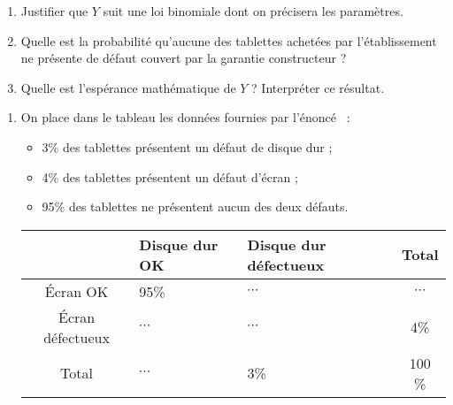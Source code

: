 \par
\begin{enumerate}
     \par
     \item %
     Justifier que $Y$ suit une loi binomiale dont on précisera les paramètres.
     \par
     \item %
     Quelle est la probabilité qu'aucune des tablettes achetées par l'établissement ne présente de défaut couvert par la garantie constructeur ?
     \par
     \item %
     Quelle est l'espérance mathématique de $Y$ ? Interpréter ce résultat.
     \par
\end{enumerate}
\begin{corrige}
     \par
     \begin{enumerate}
          \par
          \item %
          On place dans le tableau les données fournies par l'énoncé ~:
          \par
          \begin{itemize}
               \item %
               3\% des tablettes présentent un défaut de disque dur ;
               \item %
               4\% des tablettes présentent un défaut d'écran ;
               \item %
               95\% des tablettes ne présentent aucun des deux défauts.
          \end{itemize}
          \begin{center}
               \begin{tabular}{|c|p{2cm}|p{2cm}|c|}%
                    \hline
                    $\ $ & Disque dur OK & Disque dur défectueux & Total \\
                    \hline
                    \'Ecran OK &  95\% & $\cdots$ & $\cdots$ \\
                    \hline
                    \'Ecran défectueux & $\cdots$ & $\cdots$ & 4\% \\
                    \hline
                    Total & $\cdots$ & 3\% & 100 \% \\
                    \hline
               \end{tabular}

\end{center}
\end{enumerate}
\end{corrige}
